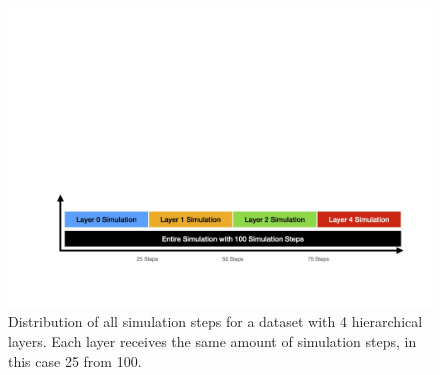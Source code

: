 \begin{figure}[h]
    \centering
    \includegraphics[width=\textwidth, trim={5cm 5cm 0 25cm},clip]{graphics/simulationStepsSplit.jpg}
    \caption[Distribution of all simulation steps.]{Distribution of all simulation steps for a dataset with 4 hierarchical layers. Each layer receives the same amount of simulation steps, in this case 25 from 100.} %
    \label{fig:SimulationSteps} 
  \end{figure}
